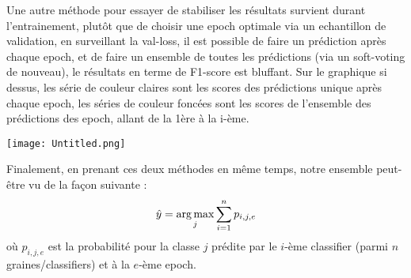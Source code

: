 Une autre méthode pour essayer de stabiliser les résultats survient durant l'entrainement, plutôt que de choisir une epoch optimale via un echantillon de validation, en surveillant la val-loss, il est possible de faire un prédiction après chaque epoch, et de faire un ensemble de toutes les prédictions (via un soft-voting de nouveau), le résultats en terme de F1-score est bluffant. Sur le graphique si dessus, les série de couleur claires sont les scores des prédictions unique après chaque epoch, les séries de couleur foncées sont les scores de l'ensemble des prédictions des epoch, allant de la 1ère à la i-ème.

\texttt{[image: Untitled.png]}

Finalement, en prenant ces deux méthodes en même temps, notre ensemble peut-être vu de la façon suivante :
$$ \hat y = \operatorname*{arg\,max}_j \sum_{i=1}^n p_{i,j,e} $$ où $p_{i,j,e}$ est la probabilité pour la classe $j$ prédite par le $i$-ème classifier (parmi $n$ graines/classifiers) et à la $e$-ème epoch.

